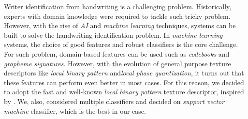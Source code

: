 Writer identification from handwriting is a challenging problem. Historically, experts with domain knowledge were required to tackle such tricky problem. However, with the rise of \emph{AI} and \emph{machine learning} techniques, systems can be built to solve the handwriting identification problem. In \emph{machine learning} systems, the choice of good features and robust classifiers is the core challenge. For such problem, domain-based features can be used such as \emph{codebooks} and \emph{grapheme signatures}. However, with the evolution of general purpose texture descriptors like \emph{local binary pattern} and\emph{local phase quantization}, it turns out that these features can perform even better in most cases. For this reason, we decided to adopt the fast and well-known \emph{local binary pattern} texture descriptor, inspired by \cite{c1}. We, also, considered multiple classifiers and decided on \emph{support vector machine} classifier, which is the best in our case.
